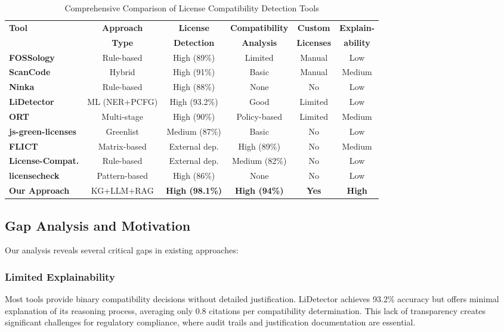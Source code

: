 \documentclass[9pt,twocolumn]{article}
\begin{document}
\begin{table*}[!t]
\centering
\caption{Comprehensive Comparison of License Compatibility Detection Tools}
\small
\begin{tabular}{|l|c|c|c|c|c|}
\hline
\textbf{Tool} & \textbf{Approach} & \textbf{License} & \textbf{Compatibility} & \textbf{Custom} & \textbf{Explain-} \\
 & \textbf{Type} & \textbf{Detection} & \textbf{Analysis} & \textbf{Licenses} & \textbf{ability} \\
\hline
\textbf{FOSSology} & Rule-based & High (89\%) & Limited & Manual & Low \\
\textbf{ScanCode} & Hybrid & High (91\%) & Basic & Manual & Medium \\
\textbf{Ninka} & Rule-based & High (88\%) & None & No & Low \\
\textbf{LiDetector} & ML (NER+PCFG) & High (93.2\%) & Good & Limited & Low \\
\textbf{ORT} & Multi-stage & High (90\%) & Policy-based & Limited & Medium \\
\textbf{js-green-licenses} & Greenlist & Medium (87\%) & Basic & No & Low \\
\textbf{FLICT} & Matrix-based & External dep. & High (89\%) & No & Medium \\
\textbf{License-Compat.} & Rule-based & External dep. & Medium (82\%) & No & Low \\
\textbf{licensecheck} & Pattern-based & High (86\%) & None & No & Low \\
\hline
\textbf{Our Approach} & KG+LLM+RAG & \textbf{High (98.1\%)} & \textbf{High (94\%)} & \textbf{Yes} & \textbf{High} \\
\hline
\end{tabular}
\label{tab:comprehensive_comparison}
\end{table*}

\subsection{Gap Analysis and Motivation}

Our analysis reveals several critical gaps in existing approaches:

\subsubsection{Limited Explainability}
Most tools provide binary compatibility decisions without detailed justification. LiDetector achieves 93.2\% accuracy but offers minimal explanation of its reasoning process, averaging only 0.8 citations per compatibility determination. This lack of transparency creates significant challenges for regulatory compliance, where audit trails and justification documentation are essential.
\end{document}

